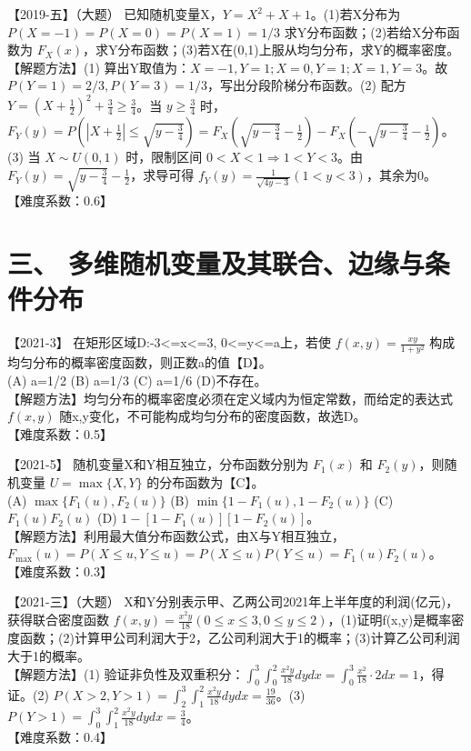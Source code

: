 \documentclass[zihao=4, a4paper, fontset=mac]{ctexart}
\begin{document}
【2019-五】（大题） 已知随机变量X，$Y=X^2+X+1$。(1)若X分布为 $P(X=-1)=P(X=0)=P(X=1)=1/3$ 求Y分布函数；(2)若给X分布函数为 $F_X(x)$，求Y分布函数；(3)若X在(0,1)上服从均匀分布，求Y的概率密度。\\
【解题方法】(1) 算出Y取值为：$X=-1, Y=1; X=0, Y=1; X=1, Y=3$。故 $P(Y=1)=2/3, P(Y=3)=1/3$，写出分段阶梯分布函数。(2) 配方 $Y=(X+\frac{1}{2})^2+\frac{3}{4}\ge\frac{3}{4}$。当 $y \ge \frac{3}{4}$ 时，$F_Y(y) = P(|X+\frac{1}{2}| \le \sqrt{y-\frac{3}{4}}) = F_X(\sqrt{y-\frac{3}{4}}-\frac{1}{2}) - F_X(-\sqrt{y-\frac{3}{4}}-\frac{1}{2})$。(3) 当 $X\sim U(0,1)$ 时，限制区间 $0<X<1 \Rightarrow 1<Y<3$。由 $F_Y(y)=\sqrt{y-\frac{3}{4}}-\frac{1}{2}$，求导可得 $f_Y(y)=\frac{1}{\sqrt{4y-3}} (1<y<3)$，其余为0。\\
【难度系数：0.6】


\section*{三、 多维随机变量及其联合、边缘与条件分布}

【2021-3】 在矩形区域D:-3<=x<=3, 0<=y<=a上，若使 $f(x,y)=\frac{xy}{1+y^2}$ 构成均匀分布的概率密度函数，则正数a的值【D】。\\
(A) a=1/2 \quad (B) a=1/3 \quad (C) a=1/6 \quad (D)不存在。\\
【解题方法】均匀分布的概率密度必须在定义域内为恒定常数，而给定的表达式 $f(x,y)$ 随x,y变化，不可能构成均匀分布的密度函数，故选D。\\
【难度系数：0.5】

\par\vspace{\baselineskip}

【2021-5】 随机变量X和Y相互独立，分布函数分别为 $F_1(x)$ 和 $F_2(y)$，则随机变量 $U=\max\{X,Y\}$ 的分布函数为【C】。\\
(A) $\max\{F_1(u),F_2(u)\}$ \quad (B) $\min\{1-F_1(u),1-F_2(u)\}$ \quad (C) $F_1(u)F_2(u)$ \quad (D) $1-[1-F_1(u)][1-F_2(u)]$。\\
【解题方法】利用最大值分布函数公式，由X与Y相互独立， $F_{\max}(u)=P(X\le u, Y\le u)=P(X\le u)P(Y\le u)=F_1(u)F_2(u)$。\\
【难度系数：0.3】

\par\vspace{\baselineskip}

【2021-三】（大题） X和Y分别表示甲、乙两公司2021年上半年度的利润(亿元)，获得联合密度函数 $f(x,y)=\frac{x^2y}{18} (0\le x\le 3, 0\le y\le 2)$，(1)证明f(x,y)是概率密度函数；(2)计算甲公司利润大于2，乙公司利润大于1的概率；(3)计算乙公司利润大于1的概率。\\
【解题方法】(1) 验证非负性及双重积分：$\int_0^3 \int_0^2 \frac{x^2y}{18} dydx = \int_0^3 \frac{x^2}{18} \cdot 2 dx = 1$，得证。(2) $P(X>2,Y>1)=\int_2^3 \int_1^2 \frac{x^2y}{18}dydx = \frac{19}{36}$。(3) $P(Y>1)=\int_0^3 \int_1^2 \frac{x^2y}{18}dydx = \frac{3}{4}$。\\
【难度系数：0.4】
\end{document}
